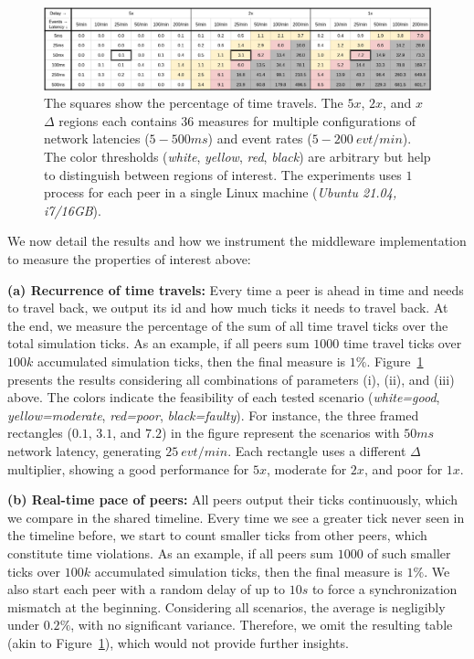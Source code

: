 \documentclass[10pt,journal,compsoc]{IEEEtran}
\begin{document}
\begin{figure}
  \centering
  \includegraphics[width=\linewidth]{baks}
  \caption{
    \label{fig.baks}
The squares show the percentage of time travels.
%
The $5x$, $2x$, and $x$ $\Delta$ regions each contains $36$ measures for
multiple configurations of network latencies ($5-500ms$) and event rates
($5-200~evt/min$).
%
The color thresholds (\emph{white}, \emph{yellow}, \emph{red}, \emph{black})
are arbitrary but help to distinguish between regions of interest.
%
The experiments uses $1$ process for each peer in a single Linux machine
(\emph{Ubuntu 21.04, i7/16GB}).
    }
\end{figure}

We now detail the results and how we instrument the middleware implementation
to measure the properties of interest above:

\textbf{(a) Recurrence of time travels:}
Every time a peer is ahead in time and needs to travel back, we output its id
and how much ticks it needs to travel back.
At the end, we measure the percentage of the sum of all time travel ticks over
the total simulation ticks.
As an example, if all peers sum $1000$ time travel ticks over $100k$
accumulated simulation ticks, then the final measure is $1\%$.
%
Figure~\ref{fig.baks} presents the results considering all combinations of
parameters (i), (ii), and (iii) above.
The colors indicate the feasibility of each tested scenario
    (\emph{white=good}, \emph{yellow=moderate}, \emph{red=poor},
    \emph{black=faulty}).
%
For instance, the three framed rectangles ($0.1$, $3.1$, and $7.2$) in the
figure represent the scenarios with $50ms$ network latency, generating
$25~evt/min$.
Each rectangle uses a different $\Delta$ multiplier, showing a good performance
for $5x$, moderate for $2x$, and poor for $1x$.

\textbf{(b) Real-time pace of peers:}
All peers output their ticks continuously, which we compare in the shared
timeline.
Every time we see a greater tick never seen in the timeline before, we start to
count smaller ticks from other peers, which constitute time violations.
As an example, if all peers sum $1000$ of such smaller ticks over $100k$
accumulated simulation ticks, then the final measure is $1\%$.
%
We also start each peer with a random delay of up to $10s$ to force a
synchronization mismatch at the beginning.
%
Considering all scenarios, the average is negligibly under $0.2\%$, with no
significant variance.
Therefore, we omit the resulting table (akin to Figure~\ref{fig.baks}), which
would not provide further insights.
\end{document}
